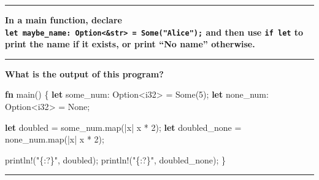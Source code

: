 \documentclass[
  11pt,
]{article}
\newenvironment{Shaded}{}{}
\newcommand{\ConstantTok}[1]{\textcolor[rgb]{0.53,0.00,0.00}{#1}}
\newcommand{\DataTypeTok}[1]{\textcolor[rgb]{0.56,0.13,0.00}{#1}}
\newcommand{\DecValTok}[1]{\textcolor[rgb]{0.25,0.63,0.44}{#1}}
\newcommand{\KeywordTok}[1]{\textcolor[rgb]{0.00,0.44,0.13}{\textbf{#1}}}
\newcommand{\NormalTok}[1]{#1}
\newcommand{\OperatorTok}[1]{\textcolor[rgb]{0.40,0.40,0.40}{#1}}
\newcommand{\PreprocessorTok}[1]{\textcolor[rgb]{0.74,0.48,0.00}{#1}}
\newcommand{\StringTok}[1]{\textcolor[rgb]{0.25,0.44,0.63}{#1}}
\begin{document}
\begin{center}\rule{0.5\linewidth}{0.5pt}\end{center}

\textbf{In a main function, declare
\texttt{let\ maybe\_name:\ Option\textless{}\&str\textgreater{}\ =\ Some("Alice");}
and then use \texttt{if\ let} to print the name if it exists, or print
``No name'' otherwise.}

\begin{Shaded}
\begin{Highlighting}[]

\end{Highlighting}
\end{Shaded}

\begin{center}\rule{0.5\linewidth}{0.5pt}\end{center}

\textbf{What is the output of this program?}

\begin{Shaded}
\begin{Highlighting}[]
\KeywordTok{fn}\NormalTok{ main() }\OperatorTok{\{}
    \KeywordTok{let}\NormalTok{ some\_num}\OperatorTok{:} \DataTypeTok{Option}\OperatorTok{\textless{}}\DataTypeTok{i32}\OperatorTok{\textgreater{}} \OperatorTok{=} \ConstantTok{Some}\NormalTok{(}\DecValTok{5}\NormalTok{)}\OperatorTok{;}
    \KeywordTok{let}\NormalTok{ none\_num}\OperatorTok{:} \DataTypeTok{Option}\OperatorTok{\textless{}}\DataTypeTok{i32}\OperatorTok{\textgreater{}} \OperatorTok{=} \ConstantTok{None}\OperatorTok{;}

    \KeywordTok{let}\NormalTok{ doubled }\OperatorTok{=}\NormalTok{ some\_num}\OperatorTok{.}\NormalTok{map(}\OperatorTok{|}\NormalTok{x}\OperatorTok{|}\NormalTok{ x }\OperatorTok{*} \DecValTok{2}\NormalTok{)}\OperatorTok{;}
    \KeywordTok{let}\NormalTok{ doubled\_none }\OperatorTok{=}\NormalTok{ none\_num}\OperatorTok{.}\NormalTok{map(}\OperatorTok{|}\NormalTok{x}\OperatorTok{|}\NormalTok{ x }\OperatorTok{*} \DecValTok{2}\NormalTok{)}\OperatorTok{;}

    \PreprocessorTok{println!}\NormalTok{(}\StringTok{"\{:?\}"}\OperatorTok{,}\NormalTok{ doubled)}\OperatorTok{;}
    \PreprocessorTok{println!}\NormalTok{(}\StringTok{"\{:?\}"}\OperatorTok{,}\NormalTok{ doubled\_none)}\OperatorTok{;}
\OperatorTok{\}}
\end{Highlighting}
\end{Shaded}

\begin{center}\rule{0.5\linewidth}{0.5pt}\end{center}
\end{document}
